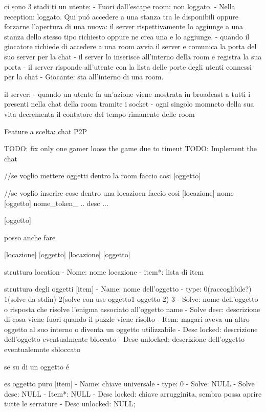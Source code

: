 ci sono 3 stadi ti un utente:
  - Fuori dall'escape room: non loggato.
  - Nella reception: loggato. Qui puó accedere a una stanza tra le disponibili oppure forzarne l'apertura di una nuova: il server rispettivamente 
  lo aggiunge a una stanza dello stesso tipo richiesto oppure ne crea una e lo aggiunge.
      - quando il giocatore richiede di accedere a una room avvia il server e comunica la porta del suo server per la chat
      - il server lo inserisce all'interno della room e registra la sua porta
      - il server risponde all'utente con la lista delle porte degli utenti connessi per la chat 
  - Giocante: sta all'interno di una room.

il server:
  - quando un utente fa un'azione viene mostrata in broadcast a tutti i presenti nella chat della room tramite
i socket
  - ogni singolo momneto della sua vita decrementa il contatore del tempo rimanente delle room 

Feature a scelta: chat P2P

TODO: fix only one gamer loose the game due to timeut
TODO: Implement the chat

//se voglio mettere oggetti dentro la room faccio cosi
[oggetto]

//se voglio inserire cose dentro una locazioen faccio cosi
[locazione] nome
  [oggetto]
    nome_token_ .. desc ...
    
  [oggetto]

posso anche fare 

[locazione]
  [oggetto]
  [locazione]
    [oggetto]
    
struttura location
  - Nome: nome locazione
  - item*: lista di item
  


struttura degli oggetti
[item]
  - Name: nome dell'oggetto
  - type: 0(raccoglibile?) 1(solve da stdin) 2(solve con use oggetto1 oggetto 2) 3  
  - Solve: nome dell'oggetto o risposta che risolve l'enigma associato all'oggetto name
  - Solve desc: descrizione di cosa viene fuori quando il puzzle viene risolto
  - Item: magari aveva un altro oggetto al suo interno o diventa un oggetto utilizzabile
  - Desc locked: descrizione dell'oggetto eventualmente bloccato
  - Desc unlocked: descrizione dell'oggetto eventualemnte sbloccato

se su di un oggetto é 

es oggetto puro
[item]
  - Name: chiave universale
  - type: 0
  - Solve: NULL
  - Solve desc: NULL
  - Item*: NULL
  - Desc locked: chiave arrugginita, sembra possa aprire tutte le serrature
  - Desc unlocked: NULL;


